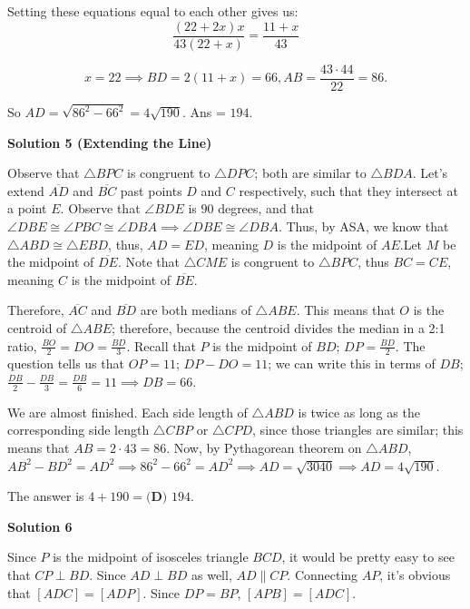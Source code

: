 \begin{enumerate}
 Setting these equations equal to each other gives us:
 \[\frac{(22 + 2x)x}{43(22 + x)} = \frac{11 + x}{43}\]

 \[x = 22 \implies BD = 2(11 + x) = 66, AB = \frac{43 \cdot 44}{22} = 86.\]

 So $AD = \sqrt{86^2 - 66^2} = 4\sqrt{190}$. Ans = $\boxed{194}$.

 



\textbf{Solution 5 (Extending the Line)}

Observe that $\triangle BPC$ is congruent to $\triangle DPC$; both are similar to $\triangle BDA$. Let's extend $\overline{AD}$ and $\overline{BC}$ past points $D$ and $C$ respectively, such that they intersect at a point $E$. Observe that $\angle BDE$ is $90$ degrees, and that $\angle DBE \cong \angle PBC \cong \angle DBA \implies \angle DBE \cong \angle DBA$. Thus, by ASA, we know that $\triangle ABD \cong \triangle EBD$, thus, $AD = ED$, meaning $D$ is the midpoint of $AE$.Let $M$ be the midpoint of $\overline{DE}$. Note that $\triangle CME$ is congruent to $\triangle BPC$, thus $BC = CE$, meaning $C$ is the midpoint of $\overline{BE}.$

 Therefore, $\overline{AC}$ and $\overline{BD}$ are both medians of $\triangle ABE$. This means that $O$ is the centroid of $\triangle ABE$; therefore, because the centroid divides the median in a 2:1 ratio, $\frac{BO}{2} = DO = \frac{BD}{3}$. Recall that $P$ is the midpoint of $BD$; $DP = \frac{BD}{2}$. The question tells us that $OP = 11$; $DP-DO=11$; we can write this in terms of $DB$; $\frac{DB}{2}-\frac{DB}{3} = \frac{DB}{6} = 11 \implies DB = 66$.

 We are almost finished. Each side length of $\triangle ABD$ is twice as long as the corresponding side length $\triangle CBP$ or $\triangle CPD$, since those triangles are similar; this means that $AB = 2 \cdot 43 = 86$. Now, by Pythagorean theorem on $\triangle ABD$, $AB^{2} - BD^{2} = AD^{2} \implies 86^{2}-66^{2} = AD^{2} \implies AD = \sqrt{3040} \implies AD = 4 \sqrt{190}$. 

 The answer is $4+190 = \boxed{\textbf{(D) }194}$.

 



\textbf{Solution 6}

Since $P$ is the midpoint of isosceles triangle $BCD$, it would be pretty easy to see that $CP\perp BD$. Since $AD\perp BD$ as well, $AD\parallel CP$. Connecting $AP$, it’s obvious that $[ADC]=[ADP]$. Since $DP=BP$, $[APB]=[ADC]$. 


\end{enumerate}
